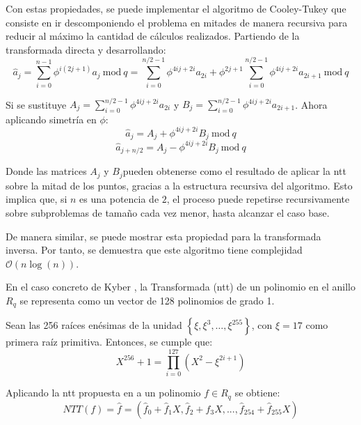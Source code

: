 Con estas propiedades, se puede implementar el algoritmo de Cooley-Tukey \cite{CooleyALG} que consiste en ir descomponiendo el problema en mitades de manera recursiva para reducir al máximo la cantidad de cálculos realizados. Partiendo de la transformada directa y desarrollando:
\begin{equation}
	\hat{a}_j=\sum_{i=0}^{n-1} \phi^{i\left(2j+1\right)} a_j \ \text{mod} \ q = \sum_{i=0}^{n/2-1} \phi^{4ij+2i} a_{2i} + \phi^{2j+1} \sum_{i=0}^{n/2-1} \phi^{4ij+2i} a_{2i+1} \ \text{mod} \ q
\end{equation}

Si se sustituye \(A_j=\sum_{i=0}^{n/2-1} \phi^{4ij+2i} a_{2i}\) y \(B_j=\sum_{i=0}^{n/2-1} \phi^{4ij+2i} a_{2i+1}\). Ahora aplicando simetría en \(\phi\):
\begin{equation}
	\hat{a}_j=A_j+\phi^{4ij+2i}B_j  \ \text{mod} \ q
\end{equation}
\begin{equation}
	\hat{a}_{j+n/2}=A_j-\phi^{4ij+2i}B_j  \ \text{mod} \ q
\end{equation}

Donde las matrices \(A_j\) y \(B_j\)pueden obtenerse como el resultado de aplicar la \gls{ntt} sobre la mitad de los puntos, gracias a la estructura recursiva del algoritmo. Esto implica que, si \(n\) es una potencia de \(2\), el proceso puede repetirse recursivamente sobre subproblemas de tamaño cada vez menor, hasta alcanzar el caso base. 
\newline

De manera similar, se puede mostrar esta propiedad para la transformada inversa. Por tanto, se demuestra que este algoritmo tiene complejidad \(\mathcal{O}(n \log(n))\).
\newline

En el caso concreto de Kyber \cite{kyber-spec-2021}, la Transformada (\gls{ntt}) de un polinomio en el anillo \(R_q\) se representa como un vector de 128 polinomios de grado 1.
\newline

Sean las 256 raíces enésimas de la unidad \(\left\{\xi, \xi^3, \dots, \xi^{255}\right\}\), con \(\xi = 17\) como primera raíz primitiva. Entonces, se cumple que:
\begin{equation}
	X^{256}+1=\prod_{i=0}^{127}\left(X^2- \xi^{2i+1}\right)
\end{equation}

Aplicando la \gls{ntt} propuesta en \cite{kyber-spec-2021} a un polinomio \(f\in R_q\) se obtiene:
\begin{equation}
	NTT(f)=\hat{f}=\left(\hat{f}_0+\hat{f}_1X,\hat{f}_2+\hat{f}_3X,...,\hat{f}_{254}+\hat{f}_{255}X\right)
\end{equation}

